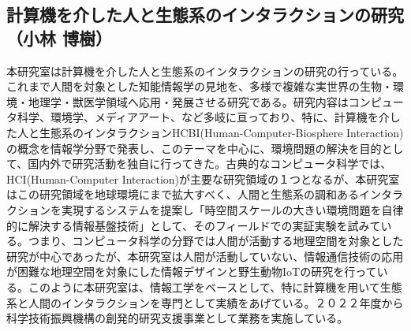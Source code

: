 \subsection{計算機を介した人と生態系のインタラクションの研究（小林 博樹）}

本研究室は計算機を介した人と生態系のインタラクションの研究の行っている。これまで人間を対象とした知能情報学の見地を、多様で複雑な実世界の生物・環境・地理学・獣医学領域へ応用・発展させる研究である。研究内容はコンピュータ科学、環境学、メディアアート、など多岐に亘っており、特に、計算機を介した人と生態系のインタラクションHCBI(Human-Computer-Biosphere Interaction)の概念を情報学分野で発表し、このテーマを中心に、環境問題の解決を目的として、国内外で研究活動を独自に行ってきた。古典的なコンピュータ科学では、HCI(Human-Computer Interaction)が主要な研究領域の１つとなるが、本研究室はこの研究領域を地球環境にまで拡大すべく、人間と生態系の調和あるインタラクションを実現するシステムを提案し「時空間スケールの大きい環境問題を自律的に解決する情報基盤技術」として、そのフィールドでの実証実験を試みている。つまり、コンピュータ科学の分野では人間が活動する地理空間を対象とした研究が中心であったが、本研究室は人間が活動していない、情報通信技術の応用が困難な地理空間を対象にした情報デザインと野生動物IoTの研究を行っている。このように本研究室は、情報工学をベースとして、特に計算機を用いて生態系と人間のインタラクションを専門として実績をあげている。２０２２年度から科学技術振興機構の創発的研究支援事業として業務を実施している。
 